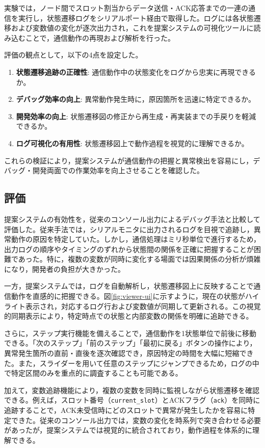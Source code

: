 \documentclass[technicalreport]{ieicej}
\begin{document}
実験では，ノード間でスロット割当からデータ送信・ACK応答までの一連の通信を実行し，状態遷移ログをシリアルポート経由で取得した。ログには各状態遷移および変数値の変化が逐次出力され，これを提案システムの可視化ツールに読み込むことで，通信動作の再現および解析を行った。

評価の観点として，以下の4点を設定した。
\begin{enumerate}
  \item \textbf{状態遷移追跡の正確性}: 通信動作中の状態変化をログから忠実に再現できるか。
  \item \textbf{デバッグ効率の向上}: 異常動作発生時に，原因箇所を迅速に特定できるか。
  \item \textbf{開発効率の向上}: 状態遷移図の修正から再生成・再実装までの手戻りを軽減できるか。
  \item \textbf{ログ可視化の有用性}: 状態遷移図上で動作過程を視覚的に理解できるか。
\end{enumerate}

これらの検証により，提案システムが通信動作の把握と異常検出を容易にし，デバッグ・開発両面での作業効率を向上させることを確認した。

\subsection{評価}
提案システムの有効性を，従来のコンソール出力によるデバッグ手法と比較して評価した。従来手法では，シリアルモニタに出力されるログを目視で追跡し，異常動作の原因を特定していた。しかし，通信処理はミリ秒単位で進行するため，出力ログの順序やタイミングのずれから状態間の関係を正確に把握することが困難であった。特に，複数の変数が同時に変化する場面では因果関係の分析が煩雑になり，開発者の負担が大きかった。

一方，提案システムでは，ログを自動解析し，状態遷移図上に反映することで通信動作を直感的に把握できる。図\ref{fig:viewer-ui}に示すように，現在の状態がハイライト表示され，対応するログ行および変数値が同期して更新される。この視覚的同期表示により，特定時点での状態と内部変数の関係を明確に追跡できる。

さらに，ステップ実行機能を備えることで，通信動作を1状態単位で前後に移動できる。「次のステップ」「前のステップ」「最初に戻る」ボタンの操作により，異常発生箇所の直前・直後を逐次確認でき，原因特定の時間を大幅に短縮できた。また，スライダーを用いて任意のステップにジャンプできるため，ログの中で特定区間のみを重点的に調査することも可能である。

加えて，変数追跡機能により，複数の変数を同時に監視しながら状態遷移を確認できる。例えば，スロット番号（\texttt{current\_slot}）とACKフラグ（\texttt{ack}）を同時に追跡することで，ACK未受信時にどのスロットで異常が発生したかを容易に特定できた。従来のコンソール出力では，変数の変化を時系列で突き合わせる必要があったが，提案システムでは視覚的に統合されており，動作過程を体系的に理解できる。
\end{document}
